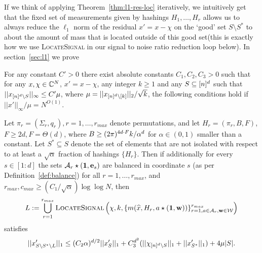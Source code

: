 If we think of applying Theorem~\ref{thm:l1-res-loc} iteratively, we intuitively get that the fixed set of measurements given by hashings $H_1,\ldots, H_r$ allows us to always reduce the $\ell_1$ norm of the residual $x'=x-\chi$ on the `good' set $S\setminus S^*$ to about the amount of mass that is located outside of this good set(this is exactly how we use \textsc{LocateSignal} in our signal to noise ratio reduction loop below). In section~\ref{sec:l1} we prove

\begin{theorem}\label{thm:l1-res-loc}
For any constant $C'>0$ there exist absolute constants $C_1, C_2, C_3>0$ such that for any $x, \chi\in \mathbb{C}^N$, $x'=x-\chi$, any integer $k\geq 1$ and any $S\subseteq {[n]^d}$ such that $||x_{{[n]^d}\setminus S}||_\infty\leq C'\mu$, where $\mu=||x_{{[n]^d}\setminus [k]}||_2/\sqrt{k}$, the following conditions hold if $||x'||_\infty/\mu=N^{O(1)}$.

Let $\pi_r=(\Sigma_r, q_r), r=1,\ldots, r_{max}$ denote permutations, and let $H_r=(\pi_r, B, F)$, $F\geq 2d, F=\Theta(d)$, where $B\geq (2\pi)^{4d\cdot F} k/\alpha^d$ for $\alpha\in (0, 1)$ smaller than a constant. Let $S^*\subseteq S$ denote the set of elements that are not isolated with respect to at least a $\sqrt{\alpha}$ fraction of hashings $\{H_r\}$. Then if additionally for every $s\in [1:d]$ the sets ${\mathcal{A}}_r\star (\mathbf{1}, \mathbf{e}_s)$ are balanced in coordinate $s$ (as per Definition~\ref{def:balance}) for all $r=1,\ldots, r_{max}$, and $r_{max}, c_{max}\geq (C_1/\sqrt{\alpha})\log\log N$, then
$$
L:=\bigcup_{r=1}^{r_{max}}\textsc{LocateSignal}\left(\chi, k, \{m(\widehat{x}, H_r, a\star (\mathbf{1}, \mathbf{w}))\}_{r=1, a\in {\mathcal{A}}_r, \mathbf{w}\in \mathcal{W}}^{r_{max}}\right)
$$
satisfies
$$
||x'_{S\setminus S^*\setminus L}||_1\leq (C_2\alpha)^{d/2} ||x'_S||_1+C_3^{d^2}(||\chi_{{[n]^d}\setminus S}||_1+||x'_{S^*}||_1)+4\mu |S|.
$$
\end{theorem}



